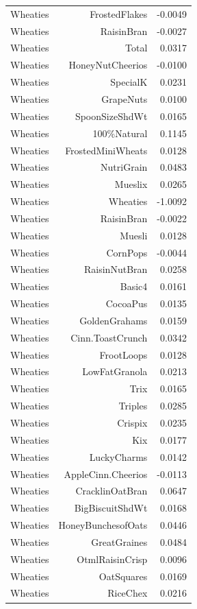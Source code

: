 \begin{longtable}{@{}lrr@{}}
Wheaties & FrostedFlakes & -0.0049 \\
Wheaties & RaisinBran & -0.0027 \\
Wheaties & Total & 0.0317 \\
Wheaties & HoneyNutCheerios & -0.0100 \\
Wheaties & SpecialK & 0.0231 \\
Wheaties & GrapeNuts & 0.0100 \\
Wheaties & SpoonSizeShdWt & 0.0165 \\
Wheaties & 100\%Natural & 0.1145 \\
Wheaties & FrostedMiniWheats & 0.0128 \\
Wheaties & NutriGrain & 0.0483 \\
Wheaties & Mueslix & 0.0265 \\
Wheaties & Wheaties & -1.0092 \\
Wheaties & RaisinBran & -0.0022 \\
Wheaties & Muesli & 0.0128 \\
Wheaties & CornPops & -0.0044 \\
Wheaties & RaisinNutBran & 0.0258 \\
Wheaties & Basic4 & 0.0161 \\
Wheaties & CocoaPus & 0.0135 \\
Wheaties & GoldenGrahams & 0.0159 \\
Wheaties & Cinn.ToastCrunch & 0.0342 \\
Wheaties & FrootLoops & 0.0128 \\
Wheaties & LowFatGranola & 0.0213 \\
Wheaties & Trix & 0.0165 \\
Wheaties & Triples & 0.0285 \\
Wheaties & Crispix & 0.0235 \\
Wheaties & Kix & 0.0177 \\
Wheaties & LuckyCharms & 0.0142 \\
Wheaties & AppleCinn.Cheerios & -0.0113 \\
Wheaties & CracklinOatBran & 0.0647 \\
Wheaties & BigBiscuitShdWt & 0.0168 \\
Wheaties & HoneyBunchesofOats & 0.0446 \\
Wheaties & GreatGraines & 0.0484 \\
Wheaties & OtmlRaisinCrisp & 0.0096 \\
Wheaties & OatSquares & 0.0169 \\
Wheaties & RiceChex & 0.0216 \\

\end{longtable}
